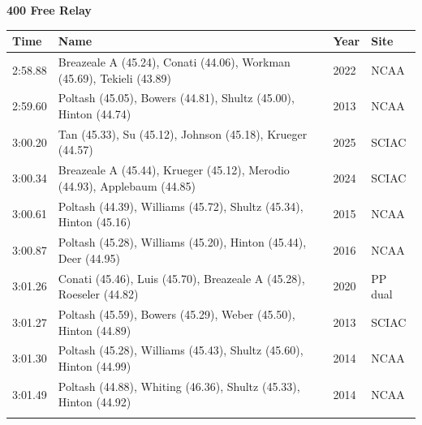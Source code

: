 \noindent\begin{minipage}[t]{0.98\textwidth}
\centering
\textbf{\textcolor{teamprimary}{400 Free Relay}}\par
\vspace{0.5em}
\centering
\small
\renewcommand{\arraystretch}{1.0}
\setlength{\tabcolsep}{4pt}
\begin{tabular}{@{}p{2.7cm}p{4.3cm}p{1.6cm}p{2.7cm}@{}}
\toprule
\textbf{Time} & \textbf{Name} & \textbf{Year} & \textbf{Site} \\
\midrule
2:58.88 & Breazeale A (45.24), Conati (44.06), Workman (45.69), Tekieli (43.89) & 2022 & NCAA \\
2:59.60 & Poltash (45.05), Bowers (44.81), Shultz (45.00), Hinton (44.74) & 2013 & NCAA \\
3:00.20 & Tan (45.33), Su (45.12), Johnson (45.18), Krueger (44.57) & 2025 & SCIAC \\
3:00.34 & Breazeale A (45.44), Krueger (45.12), Merodio (44.93), Applebaum (44.85) & 2024 & SCIAC \\
3:00.61 & Poltash (44.39), Williams (45.72), Shultz (45.34), Hinton (45.16) & 2015 & NCAA \\
3:00.87 & Poltash (45.28), Williams (45.20), Hinton (45.44), Deer (44.95) & 2016 & NCAA \\
3:01.26 & Conati (45.46), Luis (45.70), Breazeale A (45.28), Roeseler (44.82) & 2020 & PP dual \\
3:01.27 & Poltash (45.59), Bowers (45.29), Weber (45.50), Hinton (44.89) & 2013 & SCIAC \\
3:01.30 & Poltash (45.28), Williams (45.43), Shultz (45.60), Hinton (44.99) & 2014 & NCAA \\
3:01.49 & Poltash (44.88), Whiting (46.36), Shultz (45.33), Hinton (44.92) & 2014 & NCAA \\
\bottomrule
\vspace{0.5em}
\end{tabular}
\end{minipage}
\vspace{1.2em}
